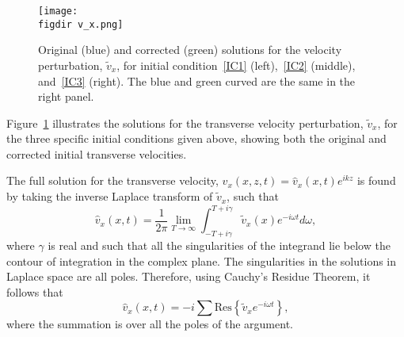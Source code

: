 \documentclass[12pt]{../style-files/ociamthesis}
\begin{document}
%
\begin{figure}
	\texttt{[image: \\figdir v\_x.png]}
	\caption{Original \cite{rae_etal81} (blue) and corrected (green) solutions for the velocity perturbation, $\tilde{v}_x$, for initial condition~\ref{IC1} (left),~\ref{IC2} (middle), and~\ref{IC3} (right). The blue and green curved are the same in the right panel.}
	\label{fig: vx}
\end{figure}
Figure~\ref{fig: vx} illustrates the solutions for the transverse velocity perturbation, $\tilde{v}_x$, for the three specific initial conditions given above, showing both the original and corrected initial transverse velocities.

The full solution for the transverse velocity, $v_x(x, z, t) = \hat{v}_x(x,t)e^{ikz}$ is found by taking the inverse Laplace transform of $\tilde{v}_x$, such that
\begin{equation}
\hat{v}_x(x,t) = \frac{1}{2\pi} \lim_{T \to \infty} \int_{-T+ i\gamma}^{T + i\gamma} \tilde{v}_x(x)e^{-i\omega t} d\omega,
\end{equation}
where $\gamma$ is real and such that all the singularities of the integrand lie below the contour of integration in the complex plane. The singularities in the solutions in Laplace space are all poles. Therefore, using Cauchy's Residue Theorem, it follows that
\begin{equation}
\hat{v}_x(x, t) = -i\sum \mathrm{Res}\left\{\tilde{v}_xe^{-i\omega t}\right\},
\end{equation}
where the summation is over all the poles of the argument.
\end{document}
